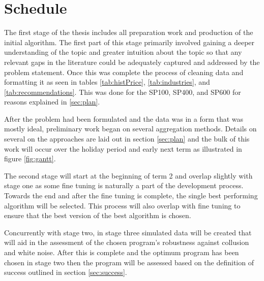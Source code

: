 \section{Schedule}\label{sec:schedule}
The first stage of the thesis includes all preparation work and production of the initial algorithm. The first part of this stage primarily involved gaining a deeper understanding of the topic and greater intuition about the topic so that any relevant gaps in the literature could be adequately captured and addressed by the problem statement. Once this was complete the process of cleaning data and formatting it as seen in tables \ref{tab:histPrice}, \ref{tab:industries}, and \ref{tab:recommendations}. This was done for the SP100, SP400, and SP600 for reasons explained in \ref{sec:plan}. 

After the problem had been formulated and the data was in a form that was mostly ideal, preliminary work began on several aggregation methods. Details on several on the approaches are laid out in section \ref{sec:plan} and the bulk of this work will occur over the holiday period and early next term as illustrated in figure \ref{fig:gantt}.

The second stage will start at the beginning of term 2 and overlap slightly with stage one as some fine tuning is naturally a part of the development process. Towards the end and after the fine tuning is complete, the single best performing algorithm will be selected. This process will also overlap with fine tuning to ensure that the best version of the best algorithm is chosen.

Concurrently with stage two, in stage three simulated data will be created that will aid in the assessment of the chosen program's robustness against collusion and white noise. After this is complete and the optimum program has been chosen in stage two then the program will be assessed based on the definition of success outlined in section \ref{sec:success}.

